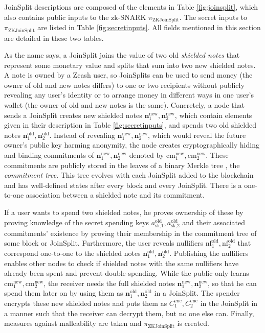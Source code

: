 \documentclass{article}
\begin{document}
JoinSplit descriptions are composed of the elements in Table \ref{fig:joinsplit}, which also contains public inputs to the zk-SNARK $\pi_\text{ZKJoinSplit}$.
The secret inputs to $\pi_\text{ZKJoinSplit}$ are listed in Table \ref{fig:secretinputs}.
All fields mentioned in this section are detailed in these two tables.

As the name says, a JoinSplit joins the value of two old \textit{shielded notes} that represent some monetary value and splits that sum into two new shielded notes.
A note is owned by a Zcash user, so JoinSplits can be used to send money (the owner of old and new notes differs) to one or two recipients without publicly revealing any user's identity or to arrange money in different ways in one user's wallet (the owner of old and new notes is the same).
Concretely, a node that sends a JoinSplit creates new shielded notes $\boldsymbol{n}^\text{new}_1,\boldsymbol{n}^\text{new}_2$, which contain elements given in their description in Table \ref{fig:secretinputs}, and spends two old shielded notes $\boldsymbol{n}^\text{old}_1,\boldsymbol{n}^\text{old}_2$.
Instead of revealing $\boldsymbol{n}^\text{new}_1,\boldsymbol{n}^\text{new}_2$, which would reveal the future owner's public key harming anonymity, the node creates cryptographically hiding and binding commitments of $\boldsymbol{n}^\text{new}_1,\boldsymbol{n}^\text{new}_2$ denoted by $\text{cm}_1^\text{new}, {\text{cm}_2^\text{new}}$.
These commitments are publicly stored in the leaves of a binary Merkle tree \cite{merkle:tree}, the \textit{commitment tree}.
This tree evolves with each JoinSplit added to the blockchain and has well-defined states after every block and every JoinSplit.
There is a one-to-one association between a shielded note and its commitment.

If a user wants to spend two shielded notes, he proves ownership of these by proving knowledge of the secret spending keys $a_\text{sk,$1$}^\text{old}, a_\text{sk,$2$}^\text{old}$ and their associated commitments' existence by proving their membership in the commitment tree of some block or JoinSplit.
Furthermore, the user reveals nullifiers $\text{nf}_1^\text{old}, {\text{nf}_2^\text{old}}$ that correspond one-to-one to the shielded notes $\boldsymbol{n}^\text{old}_1,\boldsymbol{n}^\text{old}_2$.
Publishing the nullifiers enables other nodes to check if shielded notes with the same nullifiers have already been spent and prevent double-spending.
While the public only learns $\text{cm}_1^\text{new}, {\text{cm}_2^\text{new}}$, the receiver needs the full shielded notes $\boldsymbol{n}^\text{new}_1,\boldsymbol{n}^\text{new}_2$, so that he can spend them later on by using them as $\boldsymbol{n}^\text{old}_1,\boldsymbol{n}^\text{old}_2$ in a JoinSplit.
The spender encrypts these new shielded notes and puts them as $C_1^\text{enc}, C_2^\text{enc}$ in the JoinSplit in a manner such that the receiver can decrypt them, but no one else can.
Finally, measures against malleability are taken and $\pi_\text{ZKJoinSplit}$ is created.
\end{document}
